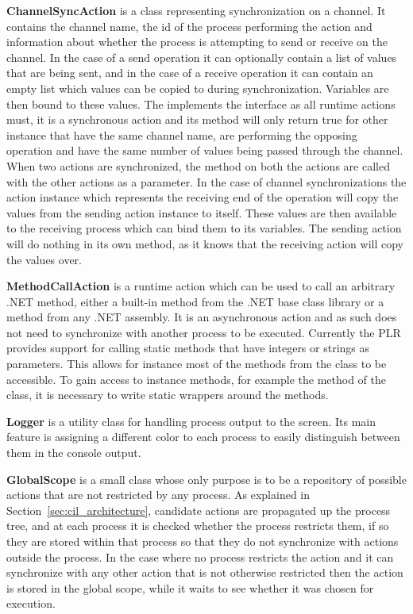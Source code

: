 	\textbf{ChannelSyncAction} is a class representing synchronization on a
	channel. It contains the channel name, the id of the process performing
	the action and information about whether the process is attempting to send
	or receive on the channel. In the case of a send operation it can optionally
	contain a list of values that are being sent, and in the case of a receive
	operation it can contain an empty list which values can be copied to during 
	synchronization. Variables are then bound to these values. The 
	 implements the  interface as all 
	runtime actions must, it is a synchronous action and its  
	method will only return true for other  instance 
	that have the same channel name, are performing the opposing operation and 
	have the same number of values being passed through the channel. When two 
	actions are synchronized, the  method on both the 
	actions are called with the other actions as a parameter. In the case of 
	channel synchronizations the action instance which represents the receiving 
	end of the operation will copy the values from the sending action instance 
	to itself. These values are then available to the receiving process which 
	can bind them to its variables. The sending action will do nothing
	in its own  method, as it knows that the receiving action will
	copy the values over.
	
	\textbf{MethodCallAction} is a runtime action which can be used to call
	an arbitrary .NET method, either a built-in method from the .NET base
	class library or a method from any .NET assembly. It is an asynchronous 
	action and as such does not need to synchronize with another process to be 
	executed. Currently	the PLR provides support for calling static methods 
	that have integers or	strings as parameters. This allows for instance most
	of the methods from the  class to be accessible. To
	gain access to instance methods, for example the  method
	of the  class, it is necessary to write static wrappers
	around the methods.

	\textbf{Logger} is a utility class for handling process output to the screen.
	Its main feature is assigning a different color to each process to 
	easily distinguish between them in the console output.

	\textbf{GlobalScope} is a small class whose only purpose is to be a 
	repository of possible actions that are not restricted by any process. As
	explained in Section~\ref{sec:cil_architecture}, candidate actions are 
	propagated up the process tree, and at each process it is checked whether 
	the process restricts them, if so they are stored within that process so 
	that they do not synchronize with actions outside the process. In the case 
	where no process restricts the action and it can synchronize with any other 
	action that is not otherwise restricted then the action is stored in the 
	global scope, while it waits to see whether it was chosen for execution.
	
